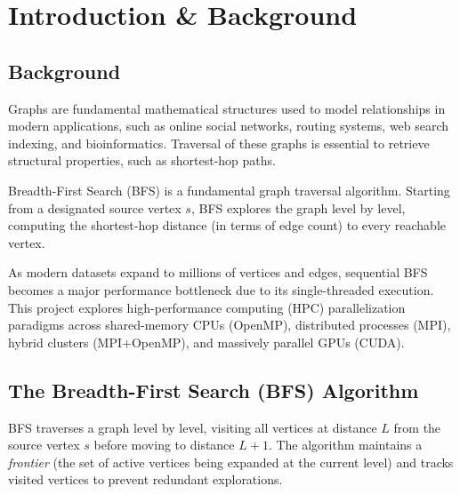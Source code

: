 \documentclass[12pt, a4paper]{article}
\begin{document}
\newpage
\tableofcontents
\newpage

\section{Introduction \& Background}

\subsection{Background}
Graphs are fundamental mathematical structures used to model relationships in modern applications, such as online social networks, routing systems, web search indexing, and bioinformatics. Traversal of these graphs is essential to retrieve structural properties, such as shortest-hop paths.

Breadth-First Search (BFS) is a fundamental graph traversal algorithm. Starting from a designated source vertex $s$, BFS explores the graph level by level, computing the shortest-hop distance (in terms of edge count) to every reachable vertex.

As modern datasets expand to millions of vertices and edges, sequential BFS becomes a major performance bottleneck due to its single-threaded execution. This project explores high-performance computing (HPC) parallelization paradigms across shared-memory CPUs (OpenMP), distributed processes (MPI), hybrid clusters (MPI+OpenMP), and massively parallel GPUs (CUDA).

\subsection{The Breadth-First Search (BFS) Algorithm}
BFS traverses a graph level by level, visiting all vertices at distance $L$ from the source vertex $s$ before moving to distance $L+1$. The algorithm maintains a \textit{frontier} (the set of active vertices being expanded at the current level) and tracks visited vertices to prevent redundant explorations.
\end{document}
